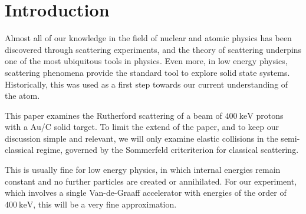 \section{Introduction} 
Almost all of our knowledge in the field of nuclear and atomic physics has been
discovered through scattering experiments, and the theory of scattering underpins
one of the most ubiquitous tools in physics.
Even more, in low energy physics, scattering phenomena provide the standard tool to
explore solid state systems. Historically, this was used as a first step
towards our current understanding of the atom.


This paper examines the Rutherford scattering of a beam of $\SI{400}{\kilo\electronvolt}$
protons with a $\mathrm{Au}$/$\mathrm{C}$ solid target. To limit the extend of
the paper, and to keep our discussion simple and relevant, we will only examine
elastic collisions in the semi-classical regime, governed by the Sommerfeld
critcriterion for classical scattering. \parencite[p. 14]{noteBB}

This is usually fine for low energy physics, in which internal energies remain
constant and no further particles are created or annihilated.
For our experiment, which involves a single Van-de-Graaff accelerator with
energies of the order of $\SI{400}{\kilo\electronvolt}$, this will be a very
fine approximation.



